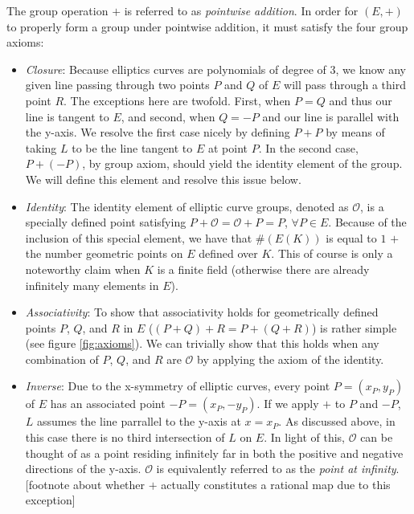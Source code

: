 The group operation $+$ is referred to as \emph{pointwise addition}. In order for $(E,+)$ to properly form a group under pointwise addition, it must satisfy the four group axioms:
\begin{itemize}
\item \emph{Closure}: Because elliptics curves are polynomials of degree of 3, we know any given line passing through two points $P$ and $Q$ of $E$ will pass through a third point $R$. The exceptions here are twofold. First, when $P = Q$ and thus our line is tangent to $E$, and second, when $Q = -P$ and our line is parallel with the y-axis. We resolve the first case nicely by defining $P + P$ by means of taking $L$ to be the line tangent to $E$ at point $P$. In the second case, $P + (-P)$, by group axiom, should yield the identity element of the group. We will define this element and resolve this issue below.  
\item \emph{Identity}: The identity element of elliptic curve groups, denoted as $\mathcal{O}$, is a specially defined point satisfying $P + \mathcal{O} = \mathcal{O} + P = P$, $\forall P \in E$. Because of the inclusion of this special element, we have that $\#(E(K))$ is equal to $1$ $+$ the number geometric points on $E$ defined over $K$. This of course is only a noteworthy claim when $K$ is a finite field (otherwise there are already infinitely many elements in $E$).
\item \emph{Associativity}: To show that associativity holds for geometrically defined points $P$, $Q$, and $R$ in $E$ ($(P + Q) + R = P + (Q + R)$) is rather simple (see figure \ref{fig:axioms}). We can trivially show that this holds when any combination of $P$, $Q$, and $R$ are $\mathcal{O}$ by applying the axiom of the identity.
\item \emph{Inverse}: Due to the x-symmetry of elliptic curves, every point $P = (x_P, y_P)$ of $E$ has an associated point $-P = (x_P, -y_P)$. If we apply $+$ to $P$ and $-P$, $L$ assumes the line parrallel to the y-axis at $x = x_P$. As discussed above, in this case there is no third intersection of $L$ on $E$. In light of this, $\mathcal{O}$ can be thought of as a point residing infinitely far in both the positive and negative directions of the y-axis. $\mathcal{O}$ is equivalently referred to as the \emph{point at infinity}.[footnote about whether $+$ actually constitutes a rational map due to this exception]
\end{itemize}

